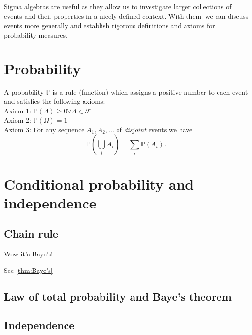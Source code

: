 Sigma algebras are useful as they allow us to investigate 
larger collections of events and their properties in a 
nicely defined context. With them, we can discuss 
events more generally and establish 
rigorous definitions and axioms for probability measures. 

\section{Probability}

\begin{definition}[Probability]\label{defn:probability}
    A probability \(\mathbb{P}\) is a rule (function) which assigns 
    a positive number to each event and satisfies the following axioms:\\
    Axiom 1: \(\mathbb{P}(A)\geq0 \forall A\in\mathcal{F}\)\\
    Axiom 2: \(\mathbb{P}(\Omega)=1\)\\
    Axiom 3: For any sequence \(A_1,A_2,...\) of \textit{disjoint} events we have
    \[\mathbb{P}(\bigcup_{i}A_i) = \sum_i \mathbb{P}(A_i)\tag{1.3}.\]
\end{definition}

\section{Conditional probability and independence}

\subsection{Chain rule}

\begin{theorem}
    Wow it's Baye's!
\end{theorem}

See \ref{thm:Baye's}

\subsection{Law of total probability and Baye's theorem}


    

\subsection{Independence}